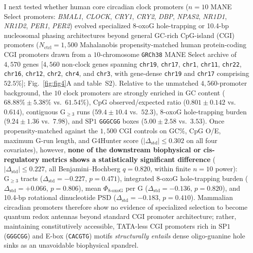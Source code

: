 \documentclass[10pt,letterpaper]{article}
\theoremstyle{plain}
\theoremstyle{definition}
\newcommand{\oxog}{\text{8-oxoG}}
\begin{document}
I next tested whether human core circadian clock promoters ($n = 10$ MANE Select promoters: \emph{BMAL1}, \emph{CLOCK}, \emph{CRY1}, \emph{CRY2}, \emph{DBP}, \emph{NPAS2}, \emph{NR1D1}, \emph{NR1D2}, \emph{PER1}, \emph{PER2}) evolved specialized $\oxog$ hole-trapping or 10.4-bp nucleosomal phasing architectures beyond general GC-rich CpG-island (CGI) promoters ($N_{\mathrm{ctrl}} = 1{,}500$ Mahalanobis propensity-matched human protein-coding CGI promoters drawn from a $10$-chromosome \texttt{GRCh38} MANE Select archive of $4{,}570$ genes [$4{,}560$ non-clock genes spanning \texttt{chr19}, \texttt{chr17}, \texttt{chr1}, \texttt{chr11}, \texttt{chr22}, \texttt{chr16}, \texttt{chr12}, \texttt{chr2}, \texttt{chr4}, and \texttt{chr3}, with gene-dense \texttt{chr19} and \texttt{chr17} comprising $52.5\%$]; Fig.~\ref{fig:fig4}A and table~S2). Relative to the unmatched $4{,}560$-promoter background, the $10$ clock promoters are strongly enriched in GC content ($68.88\% \pm 5.38\%$ vs.\ $61.54\%$), CpG observed/expected ratio ($0.801 \pm 0.142$ vs.\ $0.614$), contiguous $\mathrm{G}_{\ge 3}$ runs ($59.4 \pm 10.4$ vs.\ $52.3$), $\oxog$ hole-trapping burden ($9.24 \pm 1.36$ vs.\ $7.98$), and $\mathrm{SP1}$ \texttt{GGGCGG} boxes ($5.00 \pm 2.58$ vs.\ $3.53$). Once propensity-matched against the $1{,}500$ CGI controls on GC\%, CpG O/E, maximum G-run length, and G4Hunter score ($|\Delta_{\mathrm{std}}| \le 0.302$ on all four covariates), however, \textbf{none of the downstream biophysical or cis-regulatory metrics shows a statistically significant difference} ($|\Delta_{\mathrm{std}}| \le 0.227$, all Benjamini--Hochberg $q = 0.820$, within finite $n = 10$ power): $\mathrm{G}_{\ge 3}$ tracts ($\Delta_{\mathrm{std}} = -0.227$, $p = 0.471$), integrated $\oxog$ hole-trapping burden ($\Delta_{\mathrm{std}} = +0.066$, $p = 0.806$), mean $\Phi_{\oxog}$ per G ($\Delta_{\mathrm{std}} = -0.136$, $p = 0.820$), and 10.4-bp rotational dinucleotide PSD ($\Delta_{\mathrm{std}} = -0.183$, $p = 0.410$). Mammalian circadian promoters therefore show no evidence of specialized selection to become quantum redox antennas beyond standard CGI promoter architecture; rather, maintaining constitutively accessible, TATA-less CGI promoters rich in $\mathrm{SP1}$ (\texttt{GGGCGG}) and E-box (\texttt{CACGTG}) motifs \emph{structurally entails} dense oligo-guanine hole sinks as an unavoidable biophysical spandrel.
\end{document}
